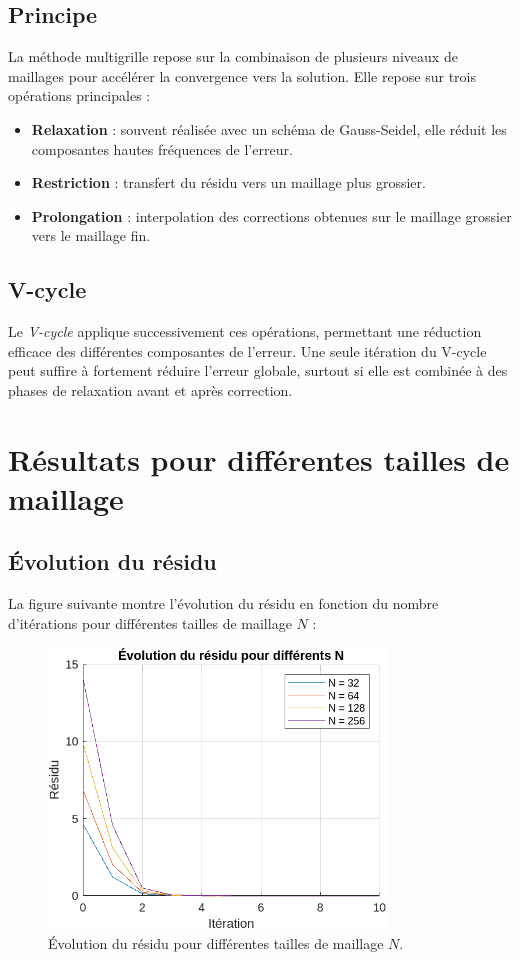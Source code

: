 \documentclass[12pt,a4paper]{article}
\begin{document}
\subsection{Principe}
La méthode multigrille repose sur la combinaison de plusieurs niveaux de maillages pour accélérer la convergence vers la solution. Elle repose sur trois opérations principales :

\begin{itemize}
    \item \textbf{Relaxation} : souvent réalisée avec un schéma de Gauss-Seidel, elle réduit les composantes hautes fréquences de l'erreur.
    \item \textbf{Restriction} : transfert du résidu vers un maillage plus grossier.
    \item \textbf{Prolongation} : interpolation des corrections obtenues sur le maillage grossier vers le maillage fin.
\end{itemize}

\subsection{V-cycle}
Le \textit{V-cycle} applique successivement ces opérations, permettant une réduction efficace des différentes composantes de l’erreur. Une seule itération du V-cycle peut suffire à fortement réduire l’erreur globale, surtout si elle est combinée à des phases de relaxation avant et après correction.

\section{Résultats pour différentes tailles de maillage}

\subsection{Évolution du résidu}
La figure suivante montre l'évolution du résidu en fonction du nombre d'itérations pour différentes tailles de maillage $N$ :

\begin{figure}[H]
    \centering
    \includegraphics[width=0.8\textwidth]{src/res.png}
    \caption{Évolution du résidu pour différentes tailles de maillage $N$.}
\end{figure}
\end{document}
